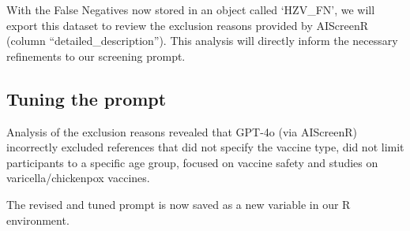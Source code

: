 \documentclass[
  letterpaper,
  DIV=11,
  numbers=noendperiod]{scrartcl}
\begin{document}
With the False Negatives now stored in an object called `HZV\_FN', we
will export this dataset to review the exclusion reasons provided by
AIScreenR (column ``detailed\_description''). This analysis will
directly inform the necessary refinements to our screening prompt.

\subsection{Tuning the prompt}\label{tuning-the-prompt}

Analysis of the exclusion reasons revealed that GPT-4o (via AIScreenR)
incorrectly excluded references that did not specify the vaccine type,
did not limit participants to a specific age group, focused on vaccine
safety and studies on varicella/chickenpox vaccines.

The revised and tuned prompt is now saved as a new variable in our R
environment.
\end{document}
